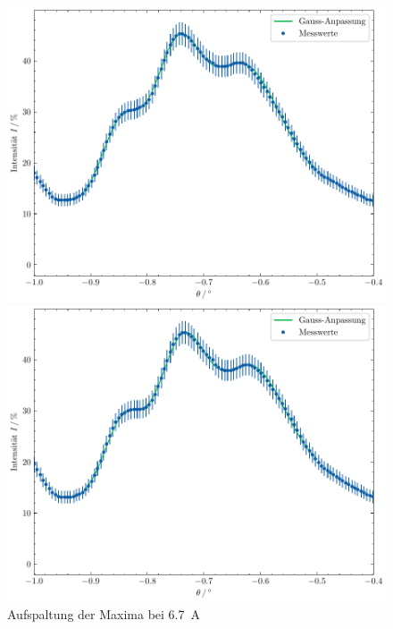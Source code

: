\begin{figure}[h]
    \centering
    \begin{minipage}{0.45\linewidth}
        \centering
        \includegraphics[width=\linewidth]{../figs/gauss_i6.3.pdf}
        \caption{Aufspaltung der Maxima bei \SI{6.3}{\ampere}}
        \label{fig:gauss_i63}
    \end{minipage}
    \hspace{.5cm}
    \begin{minipage}{0.45\linewidth} 
        \centering
        \includegraphics[width=\linewidth]{../figs/gauss_i6.7.pdf}
        \caption{Aufspaltung der Maxima bei \SI{6.7}{\ampere}} 
        \label{fig:gauss_i67}
    \end{minipage}
\end{figure}

